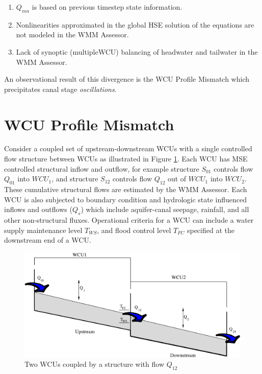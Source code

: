 \begin{enumerate}
  \item $Q_{mn}$ is based on previous timestep state information. 

  \item Nonlinearities approximated in the global HSE solution of the
    equations are not modeled in the WMM Assessor.

  \item Lack of synoptic (multipleWCU) balancing of headwater and
    tailwater in the WMM Assessor.
\end{enumerate}

An observational result of this divergence is the WCU Profile Mismatch
which precipitates canal stage \emph{oscillations}. 

\section{WCU Profile Mismatch}
Consider a coupled set of upstream-downstream WCUs with a single
controlled flow structure between WCUs as illustrated in Figure
\ref{fig:wcusCoupled}. Each WCU has MSE controlled structural inflow
and outflow, for example structure $S_{01}$ controls flow $Q_{01}$
into $WCU_1$, and structure $S_{12}$ controls flow $Q_{12}$ out of
$WCU_1$ into $WCU_2$. These cumulative structural flows are estimated
by the WMM Assessor. Each WCU is also subjected to boundary
condition and hydrologic state influenced inflows and outflows ($Q_s$)
which include aquifer-canal seepage, rainfall, and all other
non-structural fluxes. Operational criteria for a WCU can include a
water supply maintenance level $T_{WS}$, and flood control level
$T_{FC}$ specified at the downstream end of a WCU.

 \begin{figure}
 \begin{center}
  \includegraphics[scale=.33]{Graphics/wcusCoupled.eps}
 \end{center}
 \caption{\label{fig:wcusCoupled} Two WCUs coupled by a structure with flow $Q_{12}$}
\end{figure}

